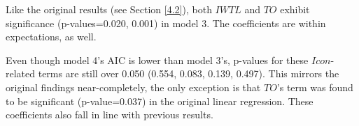 \documentclass[12pt,twoside]{reedthesis}
\begin{document}
    Like the original results (see Section \ref{4.2}), both $IWTL$ and $TO$ exhibit significance (p-values=0.020, 0.001) in model 3. The coefficients are within expectations, as well.

    Even though model 4's AIC is lower than model 3's, p-values for these $Icon$-related terms are still over 0.050 (0.554, 0.083, 0.139, 0.497). This mirrors the original findings near-completely, the only exception is that $TO$'s term was found to be significant (p-value=0.037) in the original linear regression. These coefficients also fall in line with previous results.





\end{document}
